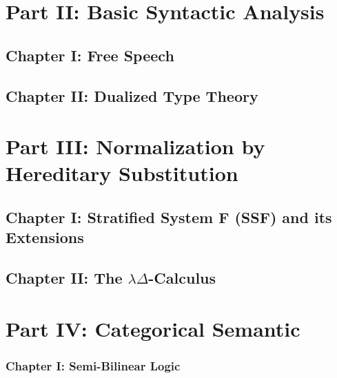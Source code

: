 \section{Part II: Basic Syntactic Analysis}
\label{sec:syntactic_analysis}

\subsection{Chapter I: Free Speech}
\label{subsec:free_speech}


\subsection{Chapter II: Dualized Type Theory}
\label{subsec:dtt}



\section{Part III: Normalization by Hereditary Substitution}
\label{sec:normalization_by_hereditary_substitution}
\subsection{Chapter I: Stratified System F (SSF) and its Extensions}
\label{subsec:stratified_system_f_ext}


\subsection{Chapter II: The $\lambda\Delta$-Calculus}
\label{subsec:the_lambdadelta-calculus}



\section{Part IV: Categorical Semantic }
\label{sec:categorical_semantics}

\subsubsection{Chapter I: Semi-Bilinear Logic}
\label{subsec:semi-bilinear_logic}

